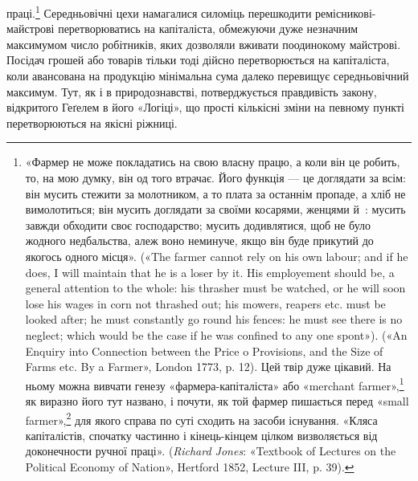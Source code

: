праці.\footnote{
«Фармер не може покладатись на свою власну працю, а коли
він це робить, то, на мою думку, він од того втрачає. Його функція — це
доглядати за всім: він мусить стежити за молотником, а то плата за останнім
пропаде, а хліб не вимолотиться; він мусить доглядати за своїми
косарями, женцями й~: мусить завжди обходити своє господарство;
мусить додивлятися, щоб не було жодного недбальства, алеж воно неминуче,
якщо він буде прикутий до якогось одного місця». («The farmer
cannot rely on his own labour; and if he does, I will maintain that he is
a loser by it. His employement should be, a general attention to the whole:
his thrasher must be watched, or he will soon lose his wages in corn not
thrashed out; his mowers, reapers etc. must be looked after; he must constantly
go round his fences: he must see there is no neglect; which would
be the case if he was confined to any one spont»). («An Enquiry into Connection
between the Price o Provisions, and the Size of Farms etc. By a
Farmer», London 1773, p. 12). Цей твір дуже цікавий. На ньому можна
вивчати генезу «фармера-капіталіста» або «merchant farmer»,\footnote*{
— фармера-купця. \emph{Ред.}
} як виразно
його тут названо, і почути, як той фармер пишається перед «small
farmer»,\footnote*{
— дрібним фармером. \emph{Ред.}
} для якого справа по суті сходить на засоби існування. «Кляса
капіталістів, спочатку частинно і кінець-кінцем цілком визволяється
від доконечности ручної праці». (\emph{Richard Jones}: «Textbook of Lectures on
the Political Economy of Nation», Hertford 1852, Lecture III, p. 39).
} Середньовічні цехи намагалися силоміць перешкодити
ремісникові-майстрові перетворюватись на капіталіста, обмежуючи
дуже незначним максимумом число робітників, яких дозволяли
вживати поодинокому майстрові. Посідач грошей або товарів
тільки тоді дійсно перетворюється на капіталіста, коли авансована
на продукцію мінімальна сума далеко перевищує середньовічний
максимум. Тут, як і в природознавстві, потверджується
правдивість закону, відкритого Геґелем в його «Логіці»,
що прості кількісні зміни на певному пункті перетворюються
на якісні ріжниці.

